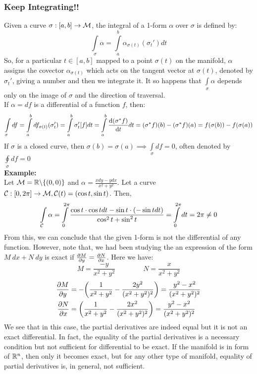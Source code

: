 \subsubsection{Keep Integrating!!}
Given a curve $\sigma: [a,b]\rightarrow\mathcal M$, the integral of a 1-form $\alpha$ over $\sigma$ is defined by:
$$\int\limits_{\sigma}\alpha = \int\limits_a^b \alpha_{\sigma(t)}(\sigma_t')dt$$
So, for a particular $t\in [a,b]$ mapped to a point $\sigma(t)$ on the manifold, $\alpha$ assigns the covector $\alpha_{\sigma(t)}$ which acts on the tangent vector at $\sigma(t)$, denoted by $\sigma_t'$, giving a number and then we integrate it. It so happens that $\int\limits_\sigma \alpha$ depends only on the image of $\sigma$ and the direction of traversal. \\[0.2cm]
If $\alpha= df$ is a differential of a function $f$, then:
$$\int\limits_\sigma df = \int\limits_a^b df_{\sigma(t)}(\sigma_t') = \int\limits_a^b \sigma_t'[f]dt = \int\limits_a^b \dv{(\sigma^*f)}{t}dt = (\sigma^*f)(b)-(\sigma^*f)(a) = f(\sigma(b))-f(\sigma(a))$$
If $\sigma$ is a closed curve, then $\sigma(b)=\sigma(a)\implies \int\limits_\sigma df = 0$, often denoted by $\oint\limits_\sigma df=0$\\[0.2cm]
\textbf{Example:}\\[0.2cm]
Let $\mathcal M=\mathbb{R}\backslash \{(0,0)\}$ and $\alpha = \frac{xdy-ydx}{x^2+y^2}$. Let a curve $\mathcal C: [0,2\pi]\rightarrow \mathcal M, \mathcal C(t) = \qty(\cos t, \sin t)$. Then,
$$\int\limits_\mathcal C \alpha = \int\limits_0^{2\pi} \frac{\cos t \cdot \cos t dt - \sin t \cdot(-\sin t dt)}{\cos^2t +\sin^2 t}=\int\limits_0^{2\pi}dt = 2\pi\neq 0$$
From this, we can conclude that the given 1-form is not the differential of any function. However, note that, we had been studying the an expression of the form $M\ dx + N\ dy$ is exact if $\pdv{M}{y} = \pdv{N}{x}$. Here we have: $$M=\frac{-y}{x^2+y^2}\qquad\qquad N=\frac{x}{x^2+y^2}$$
\begin{align*}
    \pdv{M}{y} &= -\qty(\frac{1}{x^2+y^2} -\frac{2y^2}{(x^2+y^2)^2}) = \frac{y^2-x^2}{(x^2+y^2)^2}\\
    \pdv{N}{x} &= \qty(\frac{1}{x^2+y^2} -\frac{2x^2}{(x^2+y^2)^2}) = \frac{y^2-x^2}{(x^2+y^2)^2}
\end{align*}
We see that in this case, the partial derivatives are indeed equal but it is not an exact differential. In fact, the equality of the partial derivatives is a necessary condition but not sufficient for differential to be exact. If the manifold is in form of $\mathbb{R}^n$, then only it becomes exact, but for any other type of manifold, equality of partial derivatives is, in general, not sufficient. 